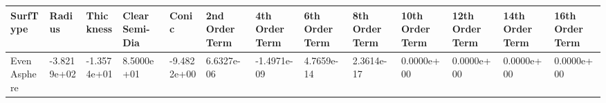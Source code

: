 \documentclass[convert={convertexe={magick.exe}}]{standalone}
\begin{document}
\begin{tabular}{lllllllllllll}
\toprule
    SurfType &      Radius &   Thickness &  Clear Semi-Dia &       Conic &  2nd Order Term &  4th Order Term &  6th Order Term &  8th Order Term &  10th Order Term &  12th Order Term &  14th Order Term &  16th Order Term \\
\midrule
Even Asphere & -3.8219e+02 & -1.3574e+01 &      8.5000e+01 & -9.4822e+00 &      6.6327e-06 &     -1.4971e-09 &      4.7659e-14 &      2.3614e-17 &       0.0000e+00 &       0.0000e+00 &       0.0000e+00 &       0.0000e+00 \\
\bottomrule
\end{tabular}
\end{document}
